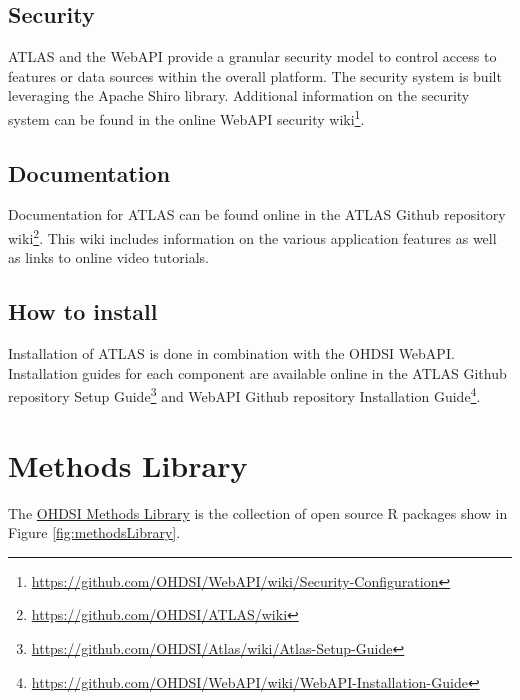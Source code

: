 \documentclass[11pt]{book}
\let\rmarkdownfootnote\footnote%
\def\footnote{\protect\rmarkdownfootnote}
\theoremstyle{definition}
\theoremstyle{definition}
\theoremstyle{definition}
\theoremstyle{remark}
\begin{document}
\hypertarget{security}{%
\subsection{Security}\label{security}}

ATLAS and the WebAPI provide a granular security model to control access to features or data sources within the overall platform. The security system is built leveraging the Apache Shiro library. Additional information on the security system can be found in the online WebAPI security wiki\footnote{\url{https://github.com/OHDSI/WebAPI/wiki/Security-Configuration}}. 

\hypertarget{documentation}{%
\subsection{Documentation}\label{documentation}}

Documentation for ATLAS can be found online in the ATLAS Github repository wiki\footnote{\url{https://github.com/OHDSI/ATLAS/wiki}}. This wiki includes information on the various application features as well as links to online video tutorials. 

\hypertarget{how-to-install}{%
\subsection{How to install}\label{how-to-install}}

Installation of ATLAS is done in combination with the OHDSI WebAPI. Installation guides for each component are available online in the ATLAS Github repository Setup Guide\footnote{\url{https://github.com/OHDSI/Atlas/wiki/Atlas-Setup-Guide}} and WebAPI Github repository Installation Guide\footnote{\url{https://github.com/OHDSI/WebAPI/wiki/WebAPI-Installation-Guide}}. 

\hypertarget{methods-library}{%
\section{Methods Library}\label{methods-library}}

The \href{https://ohdsi.github.io/MethodsLibrary/}{OHDSI Methods Library} is the collection of open source R packages show in Figure \ref{fig:methodsLibrary}. 
\end{document}
